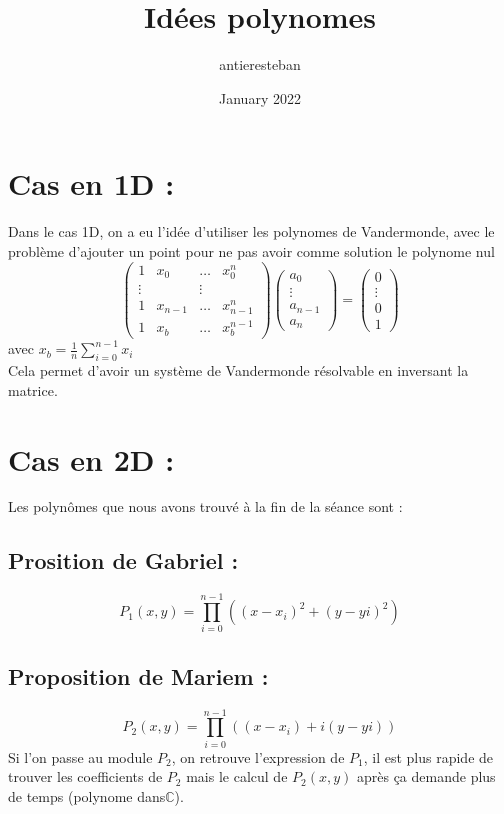 \documentclass{article}
\title{Idées polynomes}
\author{antieresteban}
\date{January 2022}
\begin{document}
\section{Cas en 1D :}
Dans le cas 1D, on a eu l'idée d'utiliser les polynomes de Vandermonde, avec le problème d'ajouter un point pour ne pas avoir comme solution le polynome nul
\begin{equation*}
    \begin{pmatrix}
    1 & x_0 & \dots & x_{0}^{n} \\
    \vdots & & \vdots \\
    1 & x_{n-1} & \dots & x_{n-1}^{n} \\
    1 & x_b & \dots & x_b^{n-1} 
    \end{pmatrix}
    \begin{pmatrix}
    a_0\\
    \vdots\\
    a_{n-1}\\
    a_{n}
    \end{pmatrix}
    =
    \begin{pmatrix}
    0\\
    \vdots\\
    0\\
    1
    \end{pmatrix}
\end{equation*}
avec $x_b = \frac{1}{n}\sum_{i=0}^{n-1} x_i$\\
Cela permet d'avoir un système de Vandermonde résolvable en inversant la matrice.


\section{Cas en 2D :}
Les polynômes que nous avons trouvé à la fin de la séance sont :

\subsection{Prosition de Gabriel :}
\begin{equation*}
    P_1(x,y) = \prod_{i=0}^{n-1}((x-x_i)^2 + (y-yi)^2)
\end{equation*}

\subsection{Proposition de Mariem :}
\begin{equation*}
    P_2(x,y) = \prod_{i=0}^{n-1}((x-x_i) + i(y-yi))
\end{equation*}
Si l'on passe au module $P_2$, on retrouve l'expression de $P_1$, il est plus rapide de trouver les coefficients de $P_2$ mais le calcul de $P_2(x,y)$ après ça demande plus de temps (polynome dans$\mathbb{C}$).\\
\end{document}
